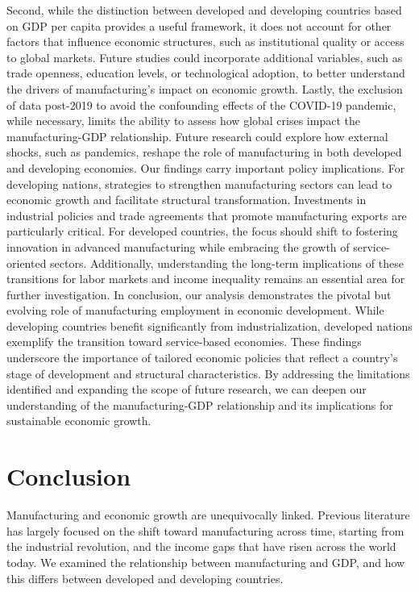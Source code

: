 \documentclass[12pt]{article}
\begin{document}
    Second, while the distinction between developed and developing countries based on GDP per capita provides a useful framework, it does not account for other factors that influence economic structures, such as institutional quality or access to global markets. Future studies could incorporate additional variables, such as trade openness, education levels, or technological adoption, to better understand the drivers of manufacturing’s impact on economic growth.
    Lastly, the exclusion of data post-2019 to avoid the confounding effects of the COVID-19 pandemic, while necessary, limits the ability to assess how global crises impact the manufacturing-GDP relationship. Future research could explore how external shocks, such as pandemics, reshape the role of manufacturing in both developed and developing economies.
    Our findings carry important policy implications. For developing nations, strategies to strengthen manufacturing sectors can lead to economic growth and facilitate structural transformation. Investments in industrial policies and trade agreements that promote manufacturing exports are particularly critical. For developed countries, the focus should shift to fostering innovation in advanced manufacturing while embracing the growth of service-oriented sectors. Additionally, understanding the long-term implications of these transitions for labor markets and income inequality remains an essential area for further investigation.
    In conclusion, our analysis demonstrates the pivotal but evolving role of manufacturing employment in economic development. While developing countries benefit significantly from industrialization, developed nations exemplify the transition toward service-based economies. These findings underscore the importance of tailored economic policies that reflect a country’s stage of development and structural characteristics. By addressing the limitations identified and expanding the scope of future research, we can deepen our understanding of the manufacturing-GDP relationship and its implications for sustainable economic growth.


\section{Conclusion}
\label{sec:conclusion}

Manufacturing and economic growth are unequivocally linked. Previous literature has largely focused on the shift toward manufacturing across time, starting from the industrial revolution, and the income gaps that have risen across the world today.  We examined the relationship between manufacturing and GDP, and how this differs between developed and developing countries.
\end{document}
